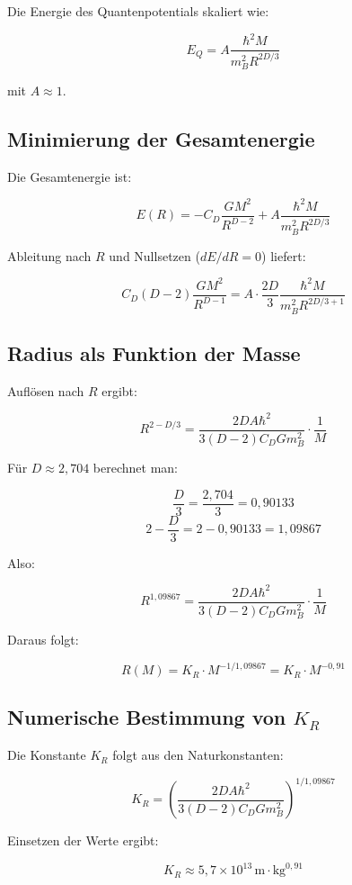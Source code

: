 Die Energie des Quantenpotentials skaliert wie:

\[
E_Q = A \frac{\hbar^2 M}{m_B^2 R^{2D/3}} \tag{K.10}
\]

mit \( A \approx 1 \).

\subsection{Minimierung der Gesamtenergie}
\label{sub:bec_minimierung}

Die Gesamtenergie ist:

\[
E(R) = -C_D \frac{GM^2}{R^{D-2}} + A \frac{\hbar^2 M}{m_B^2 R^{2D/3}} \tag{K.11}
\]

Ableitung nach \( R \) und Nullsetzen (\( dE/dR = 0 \)) liefert:

\[
C_D (D-2) \frac{GM^2}{R^{D-1}} = A \cdot \frac{2D}{3} \frac{\hbar^2 M}{m_B^2 R^{2D/3 + 1}} \tag{K.12}
\]

\subsection{Radius als Funktion der Masse}
\label{sub:bec_radius_formel}

Auflösen nach \( R \) ergibt:

\[
R^{2 - D/3} = \frac{2D A \hbar^2}{3(D-2) C_D G m_B^2} \cdot \frac{1}{M} \tag{K.13}
\]

Für \( D \approx 2,704 \) berechnet man:

\[
\frac{D}{3} = \frac{2,704}{3} = 0,90133
\]
\[
2 - \frac{D}{3} = 2 - 0,90133 = 1,09867
\]

Also:

\[
R^{1,09867} = \frac{2D A \hbar^2}{3(D-2) C_D G m_B^2} \cdot \frac{1}{M}
\]

Daraus folgt:

\[
R(M) = K_R \cdot M^{-1/1,09867} = K_R \cdot M^{-0,91} \tag{K.14}
\]

\subsection{Numerische Bestimmung von \( K_R \)}
\label{sub:bec_kr}

Die Konstante \( K_R \) folgt aus den Naturkonstanten:

\[
K_R = \left( \frac{2D A \hbar^2}{3(D-2) C_D G m_B^2} \right)^{1/1,09867} \tag{K.15}
\]

Einsetzen der Werte ergibt:

\[
K_R \approx 5,7 \times 10^{13} \, \text{m} \cdot \text{kg}^{0,91} \tag{K.16}
\]

